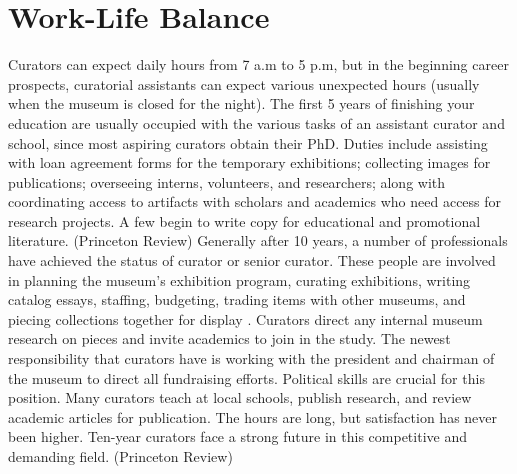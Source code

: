 \section{Work-Life Balance}
	Curators can expect daily hours from 7 a.m to 5 p.m, but in the beginning career prospects, curatorial assistants can expect various unexpected hours (usually when the museum is closed for the night). The first 5 years of finishing your education are usually occupied with the various tasks of an assistant curator and school, since most aspiring curators obtain their PhD.  Duties include assisting with loan agreement forms for the temporary exhibitions; collecting images for publications; overseeing interns, volunteers, and researchers; along with coordinating access to artifacts with scholars and academics who need access for research projects. A few begin to write copy for educational and promotional literature. (Princeton Review) Generally after 10 years, a number of professionals have achieved the status of curator or senior curator. These people are involved in planning the museum’s exhibition program, curating exhibitions, writing catalog essays, staffing, budgeting, trading items with other museums, and piecing collections together for display . Curators direct any internal museum research on pieces and invite academics to join in the study. The newest responsibility that curators have is working with the president and chairman of the museum to direct all fundraising efforts. Political skills are crucial for this position. Many curators teach at local schools, publish research, and review academic articles for publication. The hours are long, but satisfaction has never been higher. Ten-year curators face a strong future in this competitive and demanding field. (Princeton Review) 

